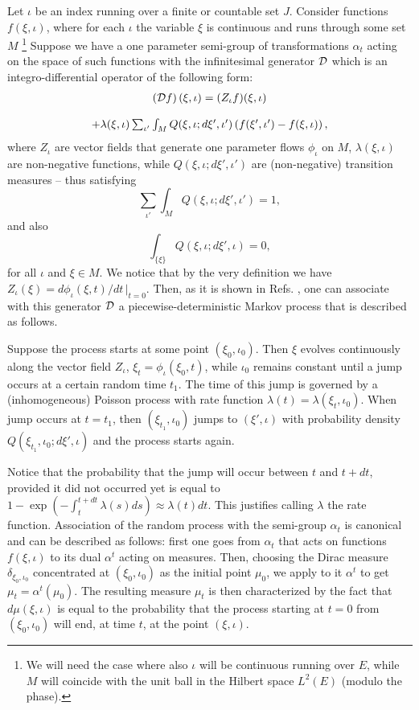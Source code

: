 \documentclass[12pt]{article}
\def\be{\begin{equation}}
\def\ee{\end{equation}}
\def\ba{\begin{array}}
\def\ea{\end{array}}
\begin{document}
Let $\iota$ be an index running over a finite or countable set $J$.
Consider functions $f(\xi ,\iota)$, where for each $\iota$ the variable
$\xi $ is continuous and runs through some set $M$ \footnote{We will need
the case where also $\iota$ will be continuous running over $E$, while $M$
will coincide with the unit ball in the Hilbert space $L^2(E)$ (modulo the
phase).} Suppose we have a one parameter semi-group of transformations
$\alpha_t$ acting on the space of such functions with the infinitesimal
generator ${\cal D}$ which is an integro-differential operator of the
following form: \be \ba{c} \left({\cal D}f\right)(\xi,\iota) =(Z_\iota
f)(\xi,\iota)\cr\cr + \lambda(\xi,\iota)\sum_{\iota'} \int_M
Q(\xi,\iota;d\xi',\iota') \left( f(\xi',\iota')-f(\xi,\iota)\right)
,\label{eq:gen} \ea \ee where $Z_\iota$ are vector fields that generate
one parameter flows $\phi_\iota$ on $M$, $\lambda(\xi,\iota)$ are
non-negative functions, while $ Q(\xi,\iota;d\xi',\iota')$ are
(non-negative) transition measures -- thus satisfying \be \sum_{\iota'}
\int_M Q(\xi,\iota;d\xi',\iota') =1 , \ee and also \be
\int_{\{\xi\}}Q(\xi,\iota;d\xi',\iota)=0 , \ee for all $\iota$ and $\xi\in
M$. We notice that by the very definition we have $Z_\iota(\xi)=
d\phi_\iota(\xi,t)/dt\, \vert_{t=0}$. Then, as it is shown in Refs.
\cite{davmha1,davmha2}, one can associate with this generator ${\cal D}$ a
piecewise-deterministic Markov process that is described as follows.

Suppose the process starts at some point $(\xi_0 ,\iota_0 )$. Then $\xi$
evolves continuously along the vector field $Z_\iota$,
$\xi_t=\phi_\iota(\xi_0,t)$, while $\iota_0$ remains constant until a jump
occurs at a certain random time $t_1$. The time of this jump is governed by
a (inhomogeneous) Poisson process with rate function
$\lambda(t)=\lambda(\xi_t,\iota_0)$. When jump occurs at $t=t_1$, then
$(\xi_{t_1},\iota_0)$ jumps to $(\xi',\iota)$ with probability density
$Q(\xi_{t_1},\iota_0;d\xi', \iota)$ and the process starts again.

\smallskip
{} Notice that the probability that the jump will occur between
$t$ and $t+dt$, provided it did not occurred yet is equal to
$1-\exp\left(-\int_t^{t+dt}\lambda(s)ds\right)\approx\lambda(t)dt$. This
justifies calling $\lambda$ the rate function.
\vskip10pt
Association of the random process with the semi-group $\alpha_t$ is
canonical and can be described as follows: first one goes from $\alpha_t$
that acts on functions $f(\xi,\iota)$ to its dual $\alpha^t$ acting on
measures. Then, choosing the Dirac measure $\delta_{\xi_0,\iota_0}$
concentrated at $(\xi_0,\iota_0)$ as the initial point $\mu_0$, we apply to
it $\alpha^t$ to get $\mu_t=\alpha^t(\mu_0)$. The resulting measure $\mu_t$
is then characterized by the fact that $d\mu(\xi,\iota)$ is equal to the
probability that the process starting at $t=0$ from $(\xi_0,\iota_0)$ will
end, at time $t$, at the point $(\xi,\iota)$.
\end{document}
